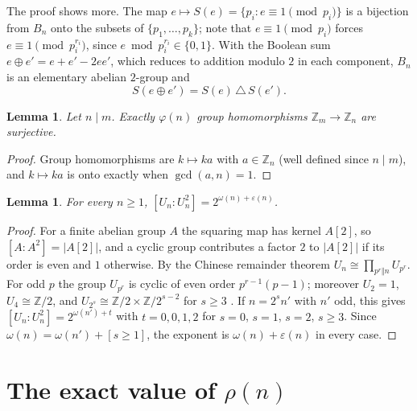 \documentclass[11pt]{article}
\newtheorem{lemma}[theorem]{Lemma}
\theoremstyle{definition}
\newcommand{\Z}{\mathbb{Z}}
\renewcommand{\phi}{\varphi}
\renewcommand{\epsilon}{\varepsilon}
\begin{document}
The proof shows more. The map $e\mapsto S(e)=\{p_i: e\equiv1\pmod{p_i}\}$ is a bijection from $B_n$ onto the subsets of $\{p_1,\dots,p_k\}$; note that $e\equiv1\pmod{p_i}$ forces $e\equiv1\pmod{p_i^{r_i}}$, since $e\bmod p_i^{r_i}\in\{0,1\}$. With the Boolean sum $e\oplus e'=e+e'-2ee'$, which reduces to addition modulo $2$ in each component, $B_n$ is an elementary abelian $2$-group and
\begin{equation}\label{eq:symdiff}
  S(e\oplus e')=S(e)\,\triangle\,S(e').
\end{equation}

\begin{lemma}\label{lem:surj}
Let $n\mid m$. Exactly $\phi(n)$ group homomorphisms $\Z_m\to\Z_n$ are surjective.
\end{lemma}

\begin{proof}
Group homomorphisms are $k\mapsto ka$ with $a\in\Z_n$ (well defined since $n\mid m$), and $k\mapsto ka$ is onto exactly when $\gcd(a,n)=1$.
\end{proof}

\begin{lemma}\label{lem:index}
For every $n\ge1$, $[U_n:U_n^2]=2^{\omega(n)+\epsilon(n)}$.
\end{lemma}

\begin{proof}
For a finite abelian group $A$ the squaring map has kernel $A[2]$, so $[A:A^2]=|A[2]|$, and a cyclic group contributes a factor $2$ to $|A[2]|$ if its order is even and $1$ otherwise. By the Chinese remainder theorem $U_n\cong\prod_{p^r\Vert n}U_{p^r}$. For odd $p$ the group $U_{p^r}$ is cyclic of even order $p^{r-1}(p-1)$; moreover $U_2=1$, $U_4\cong\Z/2$, and $U_{2^s}\cong\Z/2\times\Z/2^{s-2}$ for $s\ge3$ \cite[Chapter~4]{IR}. If $n=2^sn'$ with $n'$ odd, this gives $[U_n:U_n^2]=2^{\omega(n')+t}$ with $t=0,0,1,2$ for $s=0$, $s=1$, $s=2$, $s\ge3$. Since $\omega(n)=\omega(n')+[s\ge1]$, the exponent is $\omega(n)+\epsilon(n)$ in every case.
\end{proof}

\section{The exact value of \texorpdfstring{$\rho(n)$}{rho(n)}}\label{sec:exact}
\end{document}
